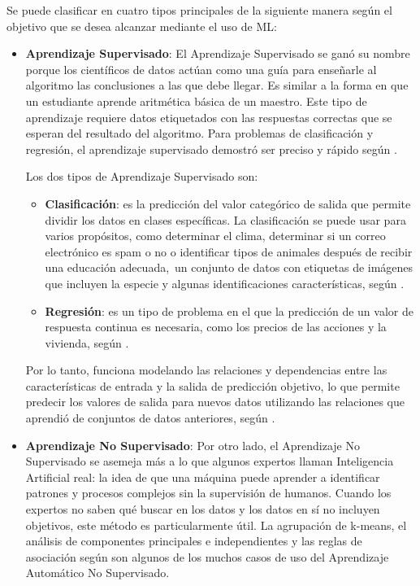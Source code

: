 Se puede clasificar en cuatro tipos principales de la siguiente manera según el objetivo que se desea alcanzar mediante el uso de ML:
\begin{itemize}
	\item \textbf{Aprendizaje Supervisado}: El Aprendizaje Supervisado se ganó su nombre porque los científicos de datos actúan como una guía para enseñarle al algoritmo las conclusiones a las que debe llegar. Es similar a la forma en que un estudiante aprende aritmética básica de un maestro. Este tipo de aprendizaje requiere datos etiquetados con las respuestas correctas que se esperan del resultado del algoritmo. Para problemas de clasificación y regresión, el aprendizaje supervisado demostró ser preciso y rápido según \cite{bk_zambrano2018supnosup}.
	
	Los dos tipos de Aprendizaje Supervisado son:

	\begin{itemize}
		\item \textbf{Clasificación}: es la predicción del valor categórico de salida que permite dividir los datos en clases específicas. La clasificación se puede usar para varios propósitos, como determinar el clima, determinar si un correo electrónico es spam o no o identificar tipos de animales después de recibir una educación adecuada, un conjunto de datos con etiquetas de imágenes que incluyen la especie y algunas identificaciones características, según \cite{bk_zambrano2018supnosup}.
		\item \textbf{Regresión}: es un tipo de problema en el que la predicción de un valor de respuesta continua es necesaria, como los precios de las acciones y la vivienda, según \cite{bk_zambrano2018supnosup}.
	\end{itemize}

	Por lo tanto, funciona modelando las relaciones y dependencias entre las características de entrada y la salida de predicción objetivo, lo que permite predecir los valores de salida para nuevos datos utilizando las relaciones que aprendió de conjuntos de datos anteriores, según \cite{bk_alpaydin2014ml}.

	\item \textbf{Aprendizaje No Supervisado}: Por otro lado, el Aprendizaje No Supervisado se asemeja más a lo que algunos expertos llaman Inteligencia Artificial real: la idea de que una máquina puede aprender a identificar patrones y procesos complejos sin la supervisión de humanos. Cuando los expertos no saben qué buscar en los datos y los datos en sí no incluyen objetivos, este método es particularmente útil. La agrupación de k-means, el análisis de componentes principales e independientes y las reglas de asociación según \cite{bk_zambrano2018supnosup} son algunos de los muchos casos de uso del Aprendizaje Automático No Supervisado.
	

\end{itemize}
